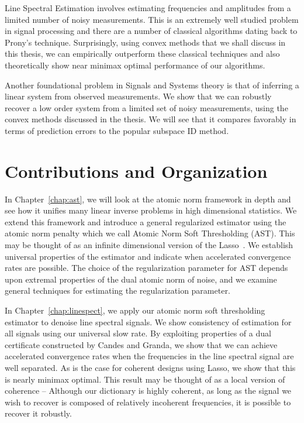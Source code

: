 Line Spectral Estimation involves estimating frequencies and amplitudes from a
limited number of noisy measurements. This is an extremely well studied problem
in signal processing and there are a number of classical algorithms dating back
to Prony's technique. Surprisingly, using convex methods that we shall discuss
in this thesis, we can empirically outperform these classical techniques and
also theoretically show near minimax optimal performance of our algorithms.

Another foundational problem in Signals and Systems theory is that of inferring
a linear system from observed measurements. We show that we can robustly recover
a low order system from a limited set of noisy measurements, using the convex
methods discussed in the thesis. We will see that it compares favorably in terms
of prediction errors to the popular subspace ID method.

\section*{Contributions and Organization} %
\label{sec:contributions}

In Chapter~\ref{chap:ast}, we will look at the atomic norm framework in depth
and see how it unifies many linear inverse problems in high dimensional
statistics. We extend this framework and introduce a general regularized
estimator using the atomic norm penalty which we call Atomic Norm Soft
Thresholding (AST). This may be thought of as an infinite dimensional version of
the Lasso~\cite{tibshirani96}. We establish universal properties of the
estimator and indicate when accelerated convergence rates are possible. The
choice of the regularization parameter for AST depends upon extremal properties
of the dual atomic norm of noise, and we examine general techniques for
estimating the regularization parameter.

In Chapter~\ref{chap:linespect}, we apply our atomic norm soft thresholding
estimator to denoise line spectral signals. We show consistency of estimation
for all signals using our universal slow rate. By exploiting properties of a
dual certificate constructed by Candes and Granda, we show that we can achieve
accelerated convergence rates when the frequencies in the line spectral signal
are well separated. As is the case for coherent designs using Lasso, we show
that this is nearly minimax optimal. This result may be thought of as a local
version of coherence -- Although our dictionary is highly coherent, as long as
the signal we wish to recover is composed of relatively incoherent frequencies,
it is possible to recover it robustly.

